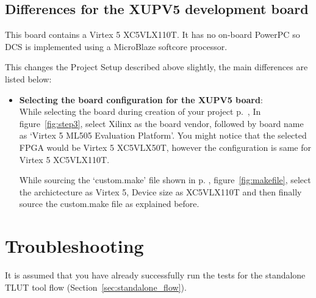\documentclass[a4paper,oneside]{memoir}
\begin{document}
\begin{itemize}
\end{itemize}

\subsection{Differences for the XUPV5  development board}\label{sec:diff_genesys}
This board contains a Virtex 5 XC5VLX110T. It has no on-board PowerPC so DCS is implemented using a MicroBlaze softcore processor.

This changes the Project Setup described above slightly, the main differences are listed below:
\begin{itemize}

\item \textbf{Selecting the board configuration for the XUPV5 board}: \\
While selecting the board during creation of your project p.\ \pageref{sec:creating_proj_blaze}, In figure~\ref{fig:step3}, select Xilinx as the board vendor, followed by board name as `Virtex 5 ML505 Evaluation Platform'. You might notice that the selected FPGA would be Virtex 5 XC5VLX50T, however the configuration is same for Virtex 5 XC5VLX110T.

While sourcing the `custom.make' file shown in p. \pageref{sec:creating_makefile}, figure~\ref{fig:makefile}, select the archictecture as Virtex 5, Device size as XC5VLX110T and then finally source the custom.make file as explained before.

\end{itemize}

\section{Troubleshooting}\label{sec:xilinx_troubleshooting}


It is assumed that you have already successfully run the tests for the standalone TLUT tool flow (Section~\ref{sec:standalone_flow}).
\end{document}
